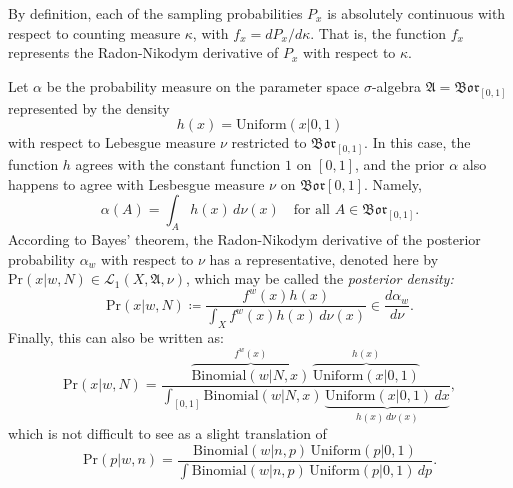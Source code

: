 \documentclass[
twoside=true,
paper=letter,
fontsize=9pt,
pagesize=auto,
leqno,
openany,
headsepline,
overfullrule,
]{scrbook}
\theoremstyle{plain}
\theoremstyle{plain}
\theoremstyle{definition}
\theoremstyle{bfnoteitalic}
\theoremstyle{bfnoteroman}
\newcommand{\sigalg}[1]{\mathfrak{#1}}
\newcommand{\cali}[1]{\mathscr{#1}}
\newcommand{\definedby}{\coloneqq}
\newcommand{\borel}{\mathfrak{Bor}}
\newcommand{\textsigma}{\hbox{\large{$\sigma$}}\kern-1pt}
\newcommand{\function}{f}
\newcommand{\functioniii}{h}
\newcommand{\measurespace}{X}
\newcommand{\measureii}{\nu}
\newcommand{\seti}{A}
\newcommand{\pspace}{\measurespace}%
\newcommand{\pspaceelt}{x}
\newcommand{\pspacesig}{\sigalg{A}}
\newcommand{\marginalone}{\alpha}%
\newcommand{\prior}{\marginalone}
\begin{document}
By definition, each of the sampling probabilities $P_\pspaceelt$ is absolutely continuous with respect to counting measure $\kappa$, with
$\function_\pspaceelt = d P_\pspaceelt/ d \kappa$. That is, the function $\function_\pspaceelt$ represents the Radon-Nikodym derivative of $P_\pspaceelt$ with respect to  $\kappa$.


Let $\prior$ be the probability measure on the parameter space \textsigma-algebra  
$\pspacesig = \borel_{[0,1]}$ represented by the density 
\[
\functioniii(\pspaceelt) = \text{Uniform}(\pspaceelt\vert 0,1)
\]
with respect to Lebesgue measure $\measureii$ restricted to $\borel_{[0,1]}$.
In this case, the function $\functioniii$ agrees with the constant function $1$ on  $[0,1]$,
and the prior $\prior$ also happens to agree with Lesbesgue measure $\measureii$ on $\borel{[0,1]}$. Namely,
\[
\prior(\seti) = \int_\seti \functioniii(\pspaceelt)\,d \measureii(\pspaceelt)
\quad\text{for all $\seti\in\borel_{[0,1]}$}.
\]
According to Bayes' theorem, the Radon-Nikodym derivative of the posterior probability $\prior_w$ with respect to $\measureii$ has a representative, denoted here by
$\text{Pr}(\pspaceelt\vert w,N) \in \cali{L}_1(\pspace,\pspacesig,\measureii)$, which may be called the
\emph{posterior density:}
\[
\text{Pr}(\pspaceelt\vert w,N) \definedby
\dfrac
{\function^w(\pspaceelt)\functioniii(\pspaceelt)}
{\int_{\pspace} \function^w(\pspaceelt)\functioniii(\pspaceelt)
\,d\measureii(\pspaceelt)}
\in
\frac{d\prior_w}{d\measureii}.
\]
Finally, this can also be written as:
\[
\text{Pr}(\pspaceelt\vert w,N)
=
\dfrac{
\overbrace{\text{Binomial}(w\vert N,\pspaceelt)}^{\function^w(\pspaceelt)}\,
\overbrace{\text{Uniform}(\pspaceelt\vert 0,1)}^{h(\pspaceelt)}
}
{\int_{[0,1]} \text{Binomial}(w\vert N,\pspaceelt)\,
\underbrace{\text{Uniform}(\pspaceelt\vert 0,1)\, d\pspaceelt}_{\functioniii(\pspaceelt)\,d\measureii(\pspaceelt)}},
\]
which is not difficult to see as a slight translation of
\[
\text{Pr}(p\vert w,n)
=
\frac{\text{Binomial}(w\vert n,p)\,\text{Uniform}(p\vert 0,1)}
{\int \text{Binomial}(w\vert n,p)\,\text{Uniform}(p\vert 0,1)\, dp}.
\]


\end{document}
